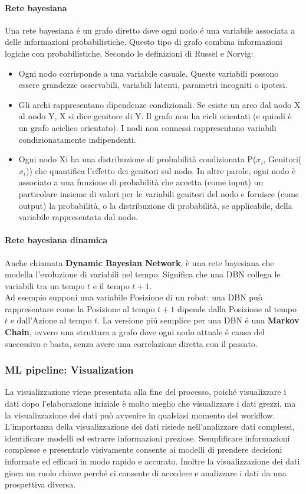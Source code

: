 \paragraph{Rete bayesiana} Una rete bayesiana é un grafo diretto dove ogni nodo é una variabile associata a delle informazioni probabilistiche. Questo tipo di grafo combina informazioni logiche con probabilistiche. Secondo le definizioni di Russel e Norvig:
\begin{itemize}
    \item Ogni nodo corrisponde a una variabile casuale. Queste variabili possono essere grandezze osservabili, variabili latenti, parametri incogniti o ipotesi.
    \item Gli archi rappresentano dipendenze condizionali. Se esiste un arco dal nodo X al nodo Y, X si dice genitore di Y. Il grafo non ha cicli orientati (e quindi è un grafo aciclico orientato). I nodi non connessi rappresentano variabili condizionatamente indipendenti.
    \item Ogni nodo Xi ha una distribuzione di probabilità condizionata P($x_i$, Genitori($x_i$)) che quantifica l'effetto dei genitori sul nodo. In altre parole, ogni nodo è associato a una funzione di probabilità che accetta (come input) un particolare insieme di valori per le variabili genitori del nodo e fornisce (come output) la probabilità, o la distribuzione di probabilità, se applicabile, della variabile rappresentata dal nodo.
\end{itemize}

\paragraph{Rete bayesiana dinamica} Anche chiamata \textbf{Dynamic Bayesian Network}, è una rete bayesiana che modella l'evoluzione di variabili nel tempo. Significa che una DBN collega le variabili tra un tempo $t$ e il tempo $t+1$. \\
Ad esempio supponi una variabile Posizione di un robot: una DBN può rappresentare come la Posizione al tempo $t+1$ dipende dalla Posizione al tempo $t$ e dall’Azione al tempo $t$. La versione piú semplice per una DBN é una \textbf{Markov Chain}, ovvero una struttura a grafo dove ogni nodo attuale é causa del successivo e basta, senza avere una correlazione diretta con il passato. 

\subsubsection*{ML pipeline: Visualization}
La visualizzazione viene presentata alla fine del processo, poiché visualizzare i dati dopo l'elaborazione iniziale
è molto meglio che visualizzare i dati grezzi, ma la visualizzazione dei dati può avvenire in qualsiasi momento
del workflow. L'importanza della visualizzazione dei dati risiede nell'analizzare dati complessi, identificare modelli ed estrarre informazioni preziose. Semplificare informazioni complesse e presentarle visivamente consente ai modelli di prendere decisioni informate ed efficaci in modo rapido e accurato. Inoltre la visualizzazione dei dati gioca un ruolo chiave perché ci consente di accedere e analizzare i dati da una prospettiva diversa. 
